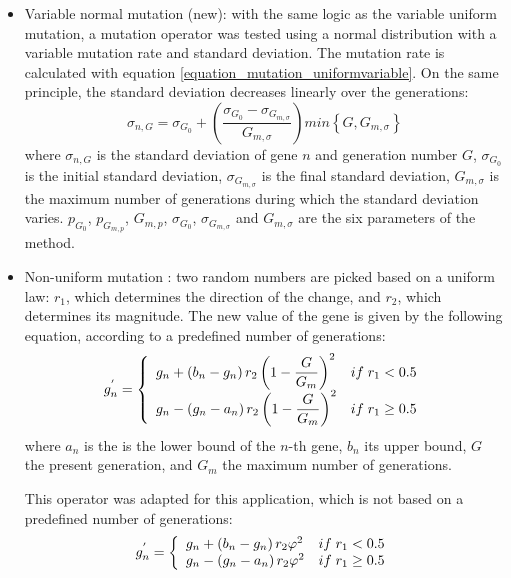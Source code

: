 \documentclass{ametsoc}
\begin{document}
\begin{itemize}
	\item Variable normal mutation (new): with the same logic as the variable uniform mutation, a mutation operator was tested using a normal distribution with a variable mutation rate and standard deviation. The mutation rate is calculated with equation \ref{equation_mutation_uniformvariable}. On the same principle, the standard deviation decreases linearly over the generations:
	\begin{equation}
	\sigma_{n,G} = \sigma_{G_{0}}+\left( \dfrac{\sigma_{G_{0}}-\sigma_{G_{m,\sigma}}}{G_{m,\sigma}} \right) min\left\lbrace G,G_{m,\sigma}\right\rbrace 
	\label{equation_mutation_normalvariable}
	\end{equation}
	where $\sigma_{n,G}$ is the standard deviation of gene $n$ and generation number $G$, $\sigma_{G_{0}}$ is the initial standard deviation, $\sigma_{G_{m,\sigma}}$ is the final standard deviation, $G_{m,\sigma}$ is the maximum number of generations during which the standard deviation varies. $p_{G_{0}}$, $p_{G_{m,p}}$, $G_{m,p}$, $\sigma_{G_{0}}$, $\sigma_{G_{m,\sigma}}$ and $G_{m,\sigma}$ are the six parameters of the method.
	
	\item Non-uniform mutation \citep{Michalewicz1996}: two random numbers are picked based on a uniform law: $r_{1}$, which determines the direction of the change, and $r_{2}$, which determines its magnitude. The new value of the gene is given by the following equation, according to a predefined number of generations:
	\begin{equation}
	g_{n}^{'} = 
	\left\lbrace \begin{array}{l l} 
	g_{n} + \left(b_{n}-g_{n}\right) r_{2} \left(1 - \dfrac{G}{G_{m}} \right)^{2} & if \; r_{1} < 0.5 \\
	g_{n} - \left(g_{n}-a_{n}\right) r_{2} \left(1 - \dfrac{G}{G_{m}} \right)^{2} & if \; r_{1} \geq 0.5 \\
	\end{array} \right.
	\label{equation_mutation_nonuniform_original}
	\end{equation}
	where $a_{n}$ is the is the lower bound of the $n$-th gene, $b_{n}$ its upper bound, $G$ the present generation, and $G_{m}$ the maximum number of generations.
	
	This operator was adapted for this application, which is not based on a predefined number of generations:
	\begin{equation}
	g_{n}^{'} = 
	\left\lbrace \begin{array}{l l} 
	g_{n} + \left(b_{n}-g_{n}\right) r_{2} \varphi^{2} & if \; r_{1} < 0.5 \\
	g_{n} - \left(g_{n}-a_{n}\right) r_{2} \varphi^{2} & if \; r_{1} \geq 0.5 \\
	\end{array} \right.
	\label{equation_mutation_nonuniform}
	\end{equation}
	

\end{itemize}
\end{document}
